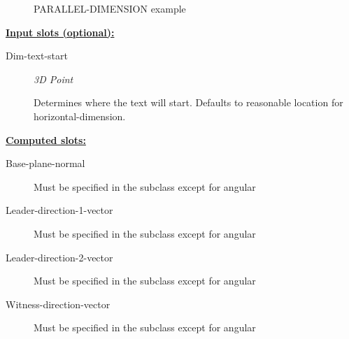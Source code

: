 \documentclass [11pt]{book}
\begin{document}
\begin{itemize}
\begin{figure}
\caption{PARALLEL-DIMENSION example}

\label{fig:PARALLEL-DIMENSION}

\end{figure}





\textbf{
\underline{Input slots (optional):}}

\begin{description}

\item [Dim-text-start]
\emph{3D Point}

 Determines where the text will start. Defaults to reasonable location for
horizontal-dimension.




\end{description}






\textbf{
\underline{Computed slots:}}

\begin{description}

\item [Base-plane-normal]

Must be specified in the subclass except for angular




\item [Leader-direction-1-vector]

Must be specified in the subclass except for angular




\item [Leader-direction-2-vector]

Must be specified in the subclass except for angular




\item [Witness-direction-vector]

Must be specified in the subclass except for angular




\end{description}








\end{itemize}
\end{document}
